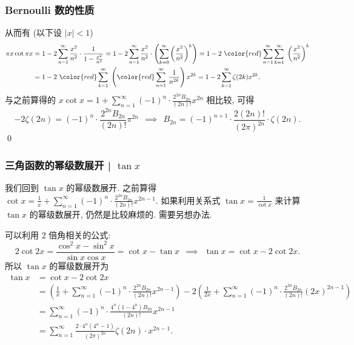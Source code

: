 
\begin{frame}
\frametitle{Bernoulli 数的性质}

从而有 (以下设 $|x| < 1$)
\begin{align*}
\pi x \cot \pi x & = 1 - 2 \sum_{n=1}^\infty \frac{x^2}{n^2} \cdot \frac{1}{1 - \frac{x^2}{n^2}} = 1 - 2 \sum_{n=1}^\infty \frac{x^2}{n^2} \cdot \left( \sum_{k=0}^\infty \left( \frac{x^2}{n^2} \right)^k \right) = 1 - 2 ~ {\color{red} \sum_{n=1}^\infty \sum_{k=1}^\infty} ~ \left( \frac{x^2}{n^2} \right)^k \\
& = 1 - 2 ~ {\color{red}\sum_{k=1}^\infty} ~ \left( {\color{red}\sum_{n=1}^\infty} ~ \frac{1}{n^{2k}} \right) x^{2k} = 1 - 2 \sum_{k=1}^\infty \zeta(2k) x^{2k}.
\end{align*}
\pause
与之前算得的 $x \cot x = 1 + \sum_{n=1}^\infty (-1)^n \cdot \frac{2^{2n} B_{2n}}{(2n)!} x^{2n}$ 相比较, 可得
\[
-2 \zeta(2n) = (-1)^n \cdot \frac{2^{2n} B_{2n}}{(2n)!} \pi^{2n} ~~ \implies ~~ B_{2n} = (-1)^{n+1} \cdot \frac{2 (2n)!}{(2\pi)^{2n}} \cdot \zeta(2n).
\]
\qed

\end{frame}


\begin{frame}
\frametitle{三角函数的幂级数展开 | $\tan x$}

我们回到 $\tan x$ 的幂级数展开. 之前算得 $\cot x = \frac{1}{x} + \sum_{n=1}^\infty (-1)^n \cdot \frac{2^{2n} B_{2n}}{(2n)!} x^{2n-1}.$ 如果利用关系式 $\tan x = \frac{1}{\cot x}$ 来计算 $\tan x$ 的幂级数展开, 仍然是比较麻烦的. 需要另想办法.

\pause
\vspace{0.5em}

\alert{可以利用 2 倍角相关的公式}:
\[
2 \cot 2x = \frac{\cos^2 x - \sin^2 x}{\sin x \cos x} = \cot x - \tan x ~~ \implies ~~ \tan x = \cot x - 2 \cot 2x.
\]
所以 $\tan x$ 的幂级数展开为
\begin{align*}
\tan x & = \cot x - 2 \cot 2x \\
& = \left( \frac{1}{x} + \sum_{n=1}^\infty (-1)^n \cdot \frac{2^{2n} B_{2n}}{(2n)!} x^{2n-1} \right) - 2 \left( \frac{1}{2x} + \sum_{n=1}^\infty (-1)^n \cdot \frac{2^{2n} B_{2n}}{(2n)!} (2x)^{2n-1} \right) \\
& = \sum_{n=1}^\infty (-1)^n \cdot \frac{4^n (1 - 4^n) B_{2n}}{(2n)!} x^{2n-1} \\
& = \sum_{n=1}^\infty \frac{2 \cdot 4^n (4^n - 1)}{(2\pi)^{2n}} \zeta(2n) \cdot x^{2n-1}.
\end{align*}

\end{frame}

